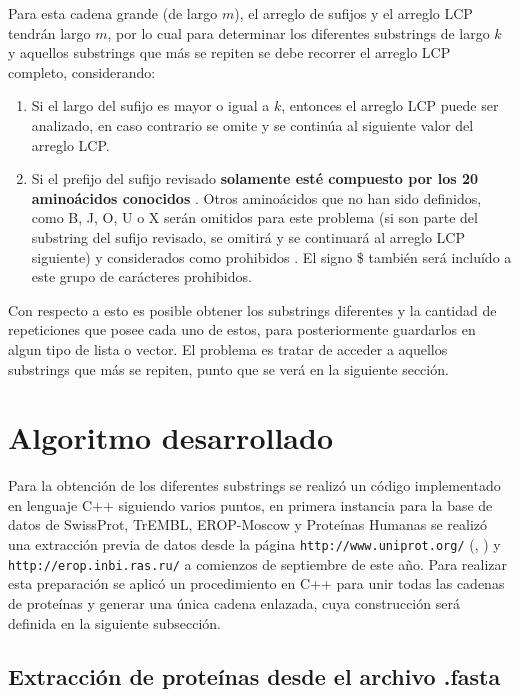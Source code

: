 Para esta cadena grande (de largo $m$), el arreglo de sufijos y el arreglo LCP tendrán largo $m$, por lo cual para determinar los diferentes substrings de largo $k$ y aquellos substrings que más se repiten se debe recorrer el arreglo LCP completo, considerando:

\begin{enumerate}
\item Si el largo del sufijo es mayor o igual a $k$, entonces el arreglo LCP puede ser analizado, en caso contrario se omite y se continúa al siguiente valor del arreglo LCP.
\item Si el prefijo del sufijo revisado \textbf{solamente esté compuesto por los 20 aminoácidos conocidos} \cite{biomolecula}. Otros aminoácidos que no han sido definidos, como B, J, O, U o X serán omitidos para este problema (si son parte del substring del sufijo revisado, se omitirá y se continuará al arreglo LCP siguiente) y considerados como prohibidos \cite{aminoacids}. El signo \$ también será incluído a este grupo de carácteres prohibidos.
\end{enumerate}

Con respecto a esto es posible obtener los substrings diferentes y la cantidad de repeticiones que posee cada uno de estos, para posteriormente guardarlos en algun tipo de lista o vector. El problema es tratar de acceder a aquellos substrings que más se repiten, punto que se verá en la siguiente sección.

\section{Algoritmo desarrollado}

Para la obtención de los diferentes substrings se realizó un código implementado en lenguaje C++ \cite{tutorial} siguiendo varios puntos, en primera instancia para la base de datos de SwissProt, TrEMBL, EROP-Moscow y Proteínas Humanas se realizó una extracción previa de datos desde la página \texttt{http://www.uniprot.org/} (\cite{swissprot}, \cite{trembl}) y \texttt{http://erop.inbi.ras.ru/} \cite{eropmoscow} a comienzos de septiembre de este año. Para realizar esta preparación se aplicó un procedimiento en C++ para unir todas las cadenas de proteínas y generar una única cadena enlazada, cuya construcción será definida en la siguiente subsección.

\subsection{Extracción de proteínas desde el archivo .fasta}

